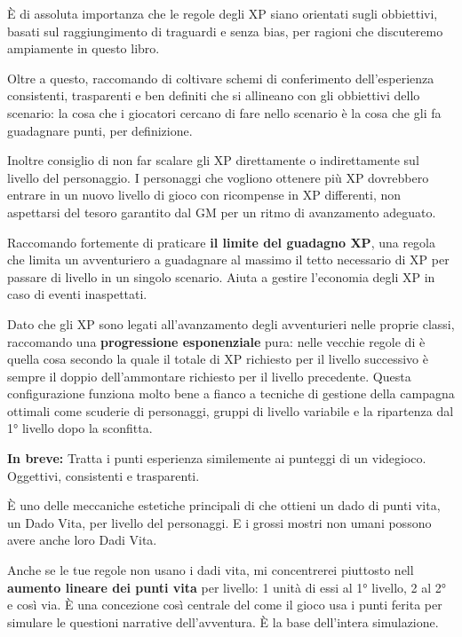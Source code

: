 È di assoluta importanza che le regole degli XP siano orientati sugli obbiettivi, basati sul raggiungimento di traguardi e senza bias, per ragioni che discuteremo ampiamente in questo libro.

Oltre a questo, raccomando di coltivare schemi di conferimento dell'esperienza consistenti, trasparenti e ben definiti che si allineano con gli obbiettivi dello scenario: la cosa che i giocatori cercano di fare nello scenario è la cosa che gli fa guadagnare punti, per definizione.

Inoltre consiglio di non far scalare gli XP direttamente o indirettamente sul livello del personaggio. I personaggi che vogliono ottenere più XP dovrebbero entrare in un nuovo livello di gioco con ricompense in XP differenti, non aspettarsi del tesoro garantito dal GM per un ritmo di avanzamento adeguato.

Raccomando fortemente di praticare \textbf{il limite del guadagno XP}, una regola che limita un avventuriero a guadagnare al massimo il tetto necessario di XP per passare di livello in un singolo scenario. Aiuta a gestire l'economia degli XP in caso di eventi inaspettati.

Dato che gli XP sono legati all'avanzamento degli avventurieri nelle proprie classi, raccomando una \textbf{progressione esponenziale} pura: nelle vecchie regole di \dnd{} è quella cosa secondo la quale il totale di XP richiesto per il livello successivo è sempre il doppio dell'ammontare richiesto per il livello precedente. Questa configurazione funziona molto bene a fianco a tecniche di gestione della campagna ottimali come scuderie di personaggi, gruppi di livello variabile e la ripartenza dal 1° livello dopo la sconfitta.

\textbf{In breve:}  Tratta i punti esperienza similemente ai punteggi di un videgioco. Oggettivi, consistenti e trasparenti.


È uno delle meccaniche estetiche principali di \dnd{} che ottieni un dado di punti vita, un Dado Vita, per livello del personaggi. E i grossi mostri non umani possono avere anche loro Dadi Vita.

Anche se le tue regole non usano i dadi vita, mi concentrerei piuttosto nell \textbf{aumento lineare dei punti vita} per livello: 1 unità di essi al 1° livello, 2 al 2° e così via. È una concezione così centrale del come il gioco usa i punti ferita per simulare le questioni narrative dell'avventura. È la base dell'intera simulazione.

